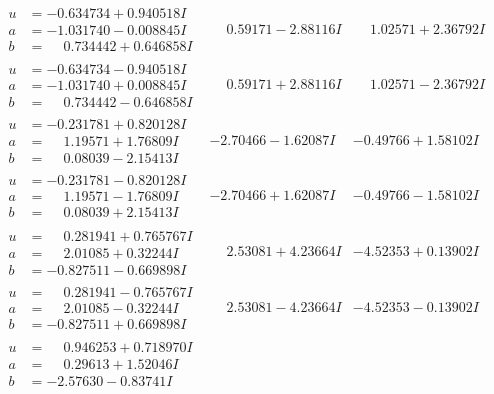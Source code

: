 \documentclass[1p]{elsarticle_modified}
\theoremstyle{definition}
\begin{document}
$$\begin{array}{c|c|c}
\begin{aligned}
u &= -0.634734 + 0.940518 I \\
a &= -1.031740 - 0.008845 I \\
b &= \phantom{-}0.734442 + 0.646858 I\end{aligned}
 & \phantom{-}0.59171 - 2.88116 I & \phantom{-}1.02571 + 2.36792 I \\ \hline\begin{aligned}
u &= -0.634734 - 0.940518 I \\
a &= -1.031740 + 0.008845 I \\
b &= \phantom{-}0.734442 - 0.646858 I\end{aligned}
 & \phantom{-}0.59171 + 2.88116 I & \phantom{-}1.02571 - 2.36792 I \\ \hline\begin{aligned}
u &= -0.231781 + 0.820128 I \\
a &= \phantom{-}1.19571 + 1.76809 I \\
b &= \phantom{-}0.08039 - 2.15413 I\end{aligned}
 & -2.70466 - 1.62087 I & -0.49766 + 1.58102 I \\ \hline\begin{aligned}
u &= -0.231781 - 0.820128 I \\
a &= \phantom{-}1.19571 - 1.76809 I \\
b &= \phantom{-}0.08039 + 2.15413 I\end{aligned}
 & -2.70466 + 1.62087 I & -0.49766 - 1.58102 I \\ \hline\begin{aligned}
u &= \phantom{-}0.281941 + 0.765767 I \\
a &= \phantom{-}2.01085 + 0.32244 I \\
b &= -0.827511 - 0.669898 I\end{aligned}
 & \phantom{-}2.53081 + 4.23664 I & -4.52353 + 0.13902 I \\ \hline\begin{aligned}
u &= \phantom{-}0.281941 - 0.765767 I \\
a &= \phantom{-}2.01085 - 0.32244 I \\
b &= -0.827511 + 0.669898 I\end{aligned}
 & \phantom{-}2.53081 - 4.23664 I & -4.52353 - 0.13902 I \\ \hline\begin{aligned}
u &= \phantom{-}0.946253 + 0.718970 I \\
a &= \phantom{-}0.29613 + 1.52046 I \\
b &= -2.57630 - 0.83741 I\end{aligned}

\end{array}$$
\end{document}
